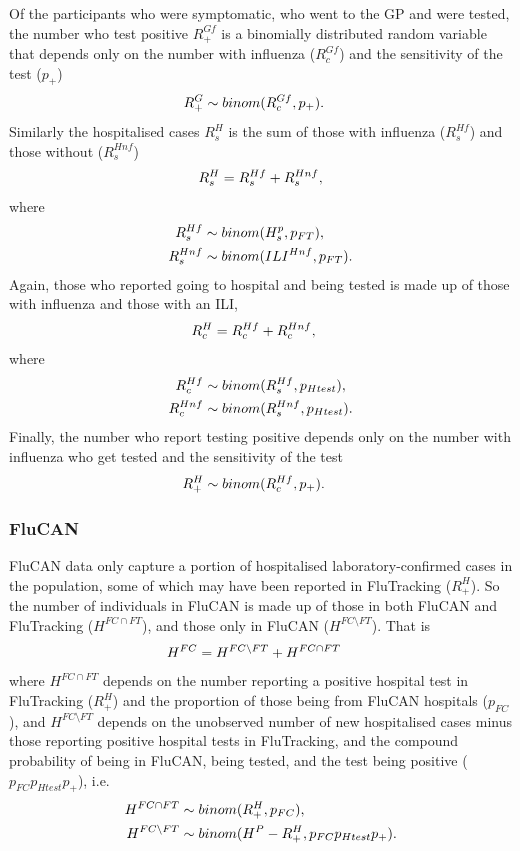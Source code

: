 Of the participants who were symptomatic, who went to the GP and were tested, the number who test positive $R_{+}^{Gf}$ is a binomially distributed random variable that depends only on the number with influenza ($R_{c}^{Gf}$) and the sensitivity of the test ($p_+$)
\begin{align} \notag
	R_+^G &\sim binom(R_{c}^{Gf},p_+).
\end{align}
Similarly the hospitalised cases $R_{s}^H$ is the sum of those with influenza ($R_{s}^{Hf}$) and those without ($R_{s}^{Hnf}$)
\begin{align} \notag
R_{s}^{H} = R_{s}^{Hf} + R_{s}^{Hnf},
\end{align} 
where 
\begin{align} \notag
R_{s}^{Hf} &\sim binom(H_{s}^p,p_{FT}), \\ \notag
R_{s}^{Hnf} &\sim binom(ILI^{Hnf},p_{FT}).
\end{align}
Again, those who reported going to hospital and being tested is made up of those with influenza and those with an ILI,
\begin{align} \notag
R_{c}^{H} &= R_{c}^{Hf} + R_{c}^{Hnf},
\end{align}
where
\begin{align} \notag
R_{c}^{Hf} &\sim binom(R_{s}^{Hf},p_{Htest}), \\ \notag
R_{c}^{Hnf} &\sim binom(R_{s}^{Hnf},p_{Htest}).
\end{align}
Finally, the number who report testing positive depends only on the number with influenza who get tested and the sensitivity of the test
\begin{align} \notag
	R_+^H &\sim binom(R_{c}^{Hf},p_+).
\end{align}

\subsubsection{FluCAN}
FluCAN data only capture a portion of hospitalised laboratory-confirmed cases in the population, some of which may have been reported in FluTracking ($R_{+}^H$). So the number of individuals in FluCAN is made up of those in both FluCAN and FluTracking ($H^{FC\cap FT}$), and those only in FluCAN ($H^{FC \setminus FT}$). That is
\begin{align} \notag
H^{FC} &= H^{FC \setminus FT} + H^{FC \cap FT}
\end{align}
where $H^{FC \cap FT}$ depends on the number reporting a positive hospital test in FluTracking ($R_{+}^H$) and the proportion of those being from FluCAN hospitals ($p_{FC}$), and $H^{FC \setminus FT}$ depends on the unobserved number of new hospitalised cases minus those reporting positive hospital tests in FluTracking, and the compound probability of being in FluCAN, being tested, and the test being positive ($p_{FC}p_{Htest}p_+$), i.e.
\begin{align} \notag
H^{FC \cap FT} &\sim binom(R_{+}^H ,p_{FC}), \\ \notag
H^{FC \setminus FT} &\sim binom(H^P - R_{+}^H, p_{FC}p_{Htest}p_+).
\end{align}

